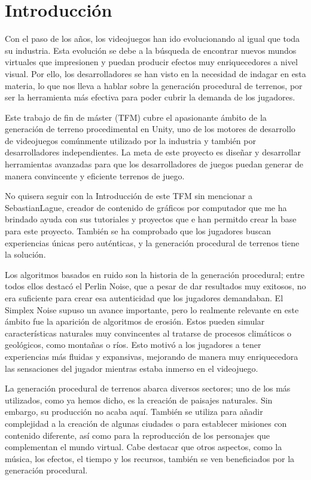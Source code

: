 
\section{Introducción}

Con el paso de los años, los videojuegos han ido evolucionando al igual que toda su industria. Esta evolución se debe a la búsqueda de encontrar nuevos mundos virtuales que impresionen y puedan producir efectos muy enriquecedores a nivel visual. Por ello, los desarrolladores se han visto en la necesidad de indagar en esta materia, lo que nos lleva a hablar sobre la generación procedural de terrenos, por ser la herramienta más efectiva para poder cubrir la demanda de los jugadores.

Este trabajo de fin de máster (TFM) cubre el apasionante ámbito de la generación de terreno procedimental en Unity, uno de los motores de desarrollo de videojuegos comúnmente utilizado por la industria y también por desarrolladores independientes. La meta de este proyecto es diseñar y desarrollar herramientas avanzadas para que los desarrolladores de juegos puedan generar de manera convincente y eficiente terrenos de juego.

No quisera seguir con la Introducción de este TFM sin mencionar a SebastianLague, creador de contenido de gráficos por computador que me ha brindado ayuda con sus tutoriales y proyectos que e han permitdo crear la base para este proyecto. También se ha comprobado que los jugadores buscan experiencias únicas pero auténticas, y la generación procedural de terrenos tiene la solución.

Los algoritmos basados en ruido son la historia de la generación procedural; entre todos ellos destacó el Perlin Noise, que a pesar de dar resultados muy exitosos, no era suficiente para crear esa autenticidad que los jugadores demandaban. El Simplex Noise supuso un avance importante, pero lo realmente relevante en este ámbito fue la aparición de algoritmos de erosión. Estos pueden simular características naturales muy convincentes al tratarse de procesos climáticos o geológicos, como montañas o ríos. Esto motivó a los jugadores a tener experiencias más fluidas y expansivas, mejorando de manera muy enriquecedora las sensaciones del jugador mientras estaba inmerso en el videojuego.

La generación procedural de terrenos abarca diversos sectores; uno de los más utilizados, como ya hemos dicho, es la creación de paisajes naturales. Sin embargo, su producción no acaba aquí. También se utiliza para añadir complejidad a la creación de algunas ciudades o para establecer misiones con contenido diferente, así como para la reproducción de los personajes que complementan el mundo virtual. Cabe destacar que otros aspectos, como la música, los efectos, el tiempo y los recursos, también se ven beneficiados por la generación procedural.

